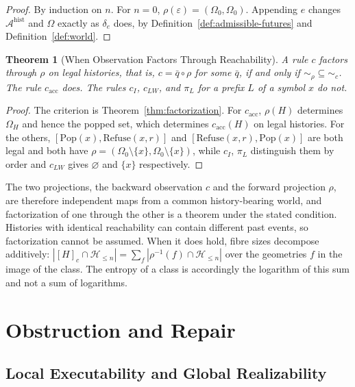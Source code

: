 \documentclass[12pt,oneside,openany]{book}
\theoremstyle{spherepop}
\newtheorem{theorem}[definition]{Theorem}
\theoremstyle{remarkstyle}
\newcommand{\Pop}{\mathrm{Pop}}
\newcommand{\Rfuse}{\mathrm{Refuse}}
\newcommand{\calA}{\mathcal{A}}
\newcommand{\calH}{\mathcal{H}}
\begin{document}
\begin{proof}
By induction on $n$. For $n=0$, $\rho(\varepsilon)=(\Omega_0,\Omega_0)$. Appending $e$ changes $\calA^{\mathrm{hist}}$ and $\Omega$ exactly as $\delta_e$ does, by Definition~\ref{def:admissible-futures} and Definition~\ref{def:world}.
\end{proof}

\begin{theorem}[When Observation Factors Through Reachability]
\label{thm:two-proj}
A rule $c$ factors through $\rho$ on legal histories, that is, $c=\bar q\circ\rho$ for some $\bar q$, if and only if ${\sim_\rho}\subseteq{\sim_c}$. The rule $c_{\mathrm{acc}}$ does. The rules $c_I$, $c_{LW}$, and $\pi_L$ for a prefix $L$ of a symbol $x$ do not.
\end{theorem}

\begin{proof}
The criterion is Theorem~\ref{thm:factorization}. For $c_{\mathrm{acc}}$, $\rho(H)$ determines $\Omega_H$ and hence the popped set, which determines $c_{\mathrm{acc}}(H)$ on legal histories. For the others, $[\Pop(x),\Rfuse(x,r)]$ and $[\Rfuse(x,r),\Pop(x)]$ are both legal and both have $\rho=(\Omega_0\setminus\{x\},\Omega_0\setminus\{x\})$, while $c_I$, $\pi_L$ distinguish them by order and $c_{LW}$ gives $\varnothing$ and $\{x\}$ respectively.
\end{proof}

The two projections, the backward observation $c$ and the forward projection $\rho$, are therefore independent maps from a common history-bearing world, and factorization of one through the other is a theorem under the stated condition. Histories with identical reachability can contain different past events, so factorization cannot be assumed. When it does hold, fibre sizes decompose additively: $|[H]_c\cap\calH_{\le n}|=\sum_f|\rho^{-1}(f)\cap\calH_{\le n}|$ over the geometries $f$ in the image of the class. The entropy of a class is accordingly the logarithm of this sum and not a sum of logarithms.

\chapter{Obstruction and Repair}
\label{ch:obstruction}

\section{Local Executability and Global Realizability}
\end{document}

